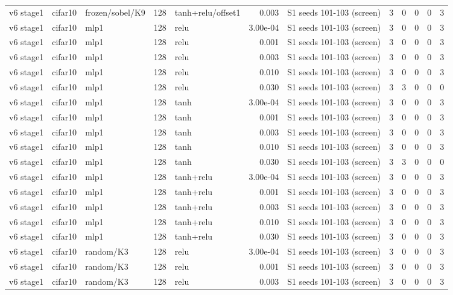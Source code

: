 \begin{table}[htbp]
{\begin{tabular}{@{}lllrlrlrrrrr@{}}
v6 stage1 & cifar10 & frozen/sobel/K9 & 128 & tanh+relu/offset1 & 0.003 & S1 seeds 101-103 (screen) & 3 & 0 & 0 & 0 & 3 \\
v6 stage1 & cifar10 & mlp1 & 128 & relu & 3.00e-04 & S1 seeds 101-103 (screen) & 3 & 0 & 0 & 0 & 3 \\
v6 stage1 & cifar10 & mlp1 & 128 & relu & 0.001 & S1 seeds 101-103 (screen) & 3 & 0 & 0 & 0 & 3 \\
v6 stage1 & cifar10 & mlp1 & 128 & relu & 0.003 & S1 seeds 101-103 (screen) & 3 & 0 & 0 & 0 & 3 \\
v6 stage1 & cifar10 & mlp1 & 128 & relu & 0.010 & S1 seeds 101-103 (screen) & 3 & 0 & 0 & 0 & 3 \\
v6 stage1 & cifar10 & mlp1 & 128 & relu & 0.030 & S1 seeds 101-103 (screen) & 3 & 3 & 0 & 0 & 0 \\
v6 stage1 & cifar10 & mlp1 & 128 & tanh & 3.00e-04 & S1 seeds 101-103 (screen) & 3 & 0 & 0 & 0 & 3 \\
v6 stage1 & cifar10 & mlp1 & 128 & tanh & 0.001 & S1 seeds 101-103 (screen) & 3 & 0 & 0 & 0 & 3 \\
v6 stage1 & cifar10 & mlp1 & 128 & tanh & 0.003 & S1 seeds 101-103 (screen) & 3 & 0 & 0 & 0 & 3 \\
v6 stage1 & cifar10 & mlp1 & 128 & tanh & 0.010 & S1 seeds 101-103 (screen) & 3 & 0 & 0 & 0 & 3 \\
v6 stage1 & cifar10 & mlp1 & 128 & tanh & 0.030 & S1 seeds 101-103 (screen) & 3 & 3 & 0 & 0 & 0 \\
v6 stage1 & cifar10 & mlp1 & 128 & tanh+relu & 3.00e-04 & S1 seeds 101-103 (screen) & 3 & 0 & 0 & 0 & 3 \\
v6 stage1 & cifar10 & mlp1 & 128 & tanh+relu & 0.001 & S1 seeds 101-103 (screen) & 3 & 0 & 0 & 0 & 3 \\
v6 stage1 & cifar10 & mlp1 & 128 & tanh+relu & 0.003 & S1 seeds 101-103 (screen) & 3 & 0 & 0 & 0 & 3 \\
v6 stage1 & cifar10 & mlp1 & 128 & tanh+relu & 0.010 & S1 seeds 101-103 (screen) & 3 & 0 & 0 & 0 & 3 \\
v6 stage1 & cifar10 & mlp1 & 128 & tanh+relu & 0.030 & S1 seeds 101-103 (screen) & 3 & 0 & 0 & 0 & 3 \\
v6 stage1 & cifar10 & random/K3 & 128 & relu & 3.00e-04 & S1 seeds 101-103 (screen) & 3 & 0 & 0 & 0 & 3 \\
v6 stage1 & cifar10 & random/K3 & 128 & relu & 0.001 & S1 seeds 101-103 (screen) & 3 & 0 & 0 & 0 & 3 \\
v6 stage1 & cifar10 & random/K3 & 128 & relu & 0.003 & S1 seeds 101-103 (screen) & 3 & 0 & 0 & 0 & 3 \\

\end{tabular}}
\end{table}
